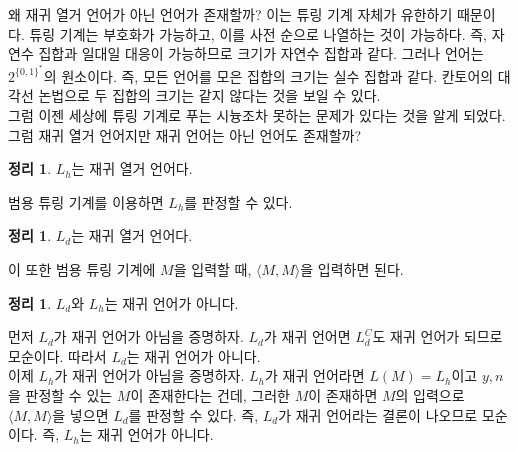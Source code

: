 \documentclass[b5paper, 10pt]{book}
\theoremstyle{definition}
\newtheorem{thm}[defn]{정리}
\newenvironment{pf*}{\pushQED{\qed}\pf}{\popQED\endpf}
\begin{document}
왜 재귀 열거 언어가 아닌 언어가 존재할까? 이는 튜링 기계 자체가 유한하기 때문이다. 튜링 기계는 부호화가 가능하고,
이를 사전 순으로 나열하는 것이 가능하다. 즉, 자연수 집합과 일대일 대응이 가능하므로 크기가 자연수 집합과 같다.
그러나 언어는 $2^{\{0,1\}^*}$의 원소이다. 즉, 모든 언어를 모은 집합의 크기는 실수 집합과 같다. 
칸토어의 대각선 논법으로 두 집합의 크기는 같지 않다는 것을 보일 수 있다. \\
그럼 이젠 세상에 튜링 기계로 푸는 시늉조차 못하는 문제가 있다는 것을 알게 되었다. 그럼
재귀 열거 언어지만 재귀 언어는 아닌 언어도 존재할까?
\begin{thm}
    $L_h$는 재귀 열거 언어다.
\end{thm}
\begin{pf*}
    범용 튜링 기계를 이용하면 $L_h$를 판정할 수 있다.
\end{pf*}
\begin{thm}
    $L_d$는 재귀 열거 언어다. 
\end{thm}
\begin{pf*}
    이 또한 범용 튜링 기계에 $M$을 입력할 때, $\langle M, M \rangle$을 입력하면 된다.
\end{pf*}
\begin{thm}
    $L_d$와 $L_h$는 재귀 언어가 아니다.
\end{thm}
\begin{pf*}
    먼저 $L_d$가 재귀 언어가 아님을 증명하자. $L_d$가 재귀 언어면 $L_d^C$도 재귀 언어가 되므로
    모순이다. 따라서 $L_d$는 재귀 언어가 아니다. \\ 
    이제 $L_h$가 재귀 언어가 아님을 증명하자. $L_h$가 재귀 언어라면 $L(M) = L_h$이고
    $y, n$을 판정할 수 있는 $M$이 존재한다는 건데, 그러한 $M$이 존재하면 $M$의 입력으로
    $\langle M, M \rangle$을 넣으면 $L_d$를 판정할 수 있다. 즉, $L_d$가 재귀 언어라는
    결론이 나오므로 모순이다. 즉, $L_h$는 재귀 언어가 아니다.
\end{pf*}
\end{document}
